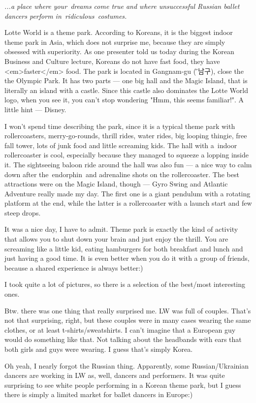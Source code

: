 \begin{post}
	\begin{content}
\textit{...a place where your dreams come true and where unsuccessful Russian ballet dancers perform in ridiculous costumes.}

Lotte World is a theme park. According to Koreans, it is the biggest indoor theme park in Asia, which does not surprise me, because they are simply obsessed with superiority. As one presenter told us today during the Korean Business and Culture lecture, Koreans do not have fast food, they have <em>faster</em> food. The park is located in Gangnam-gu ({\H 강남구}), close the the Olympic Park. It has two parts — one big hall and the Magic Island, that is literally an island with a castle. Since this castle also dominates the Lotte World logo, when you see it, you can't stop wondering "Hmm, this seems familiar!". A little hint — Disney.

I won't spend time describing the park, since it is a typical theme park with rollercoasters, merry-go-rounds, thrill rides, water rides, big looping thingie, free fall tower, lots of junk food and little screaming kids. The hall with a indoor rollercoaster is cool, especially because they managed to squeeze a lopping inside it. The sightseeing baloon ride around the hall was also fun — a nice way to calm down after the endorphin and adrenaline shots on the rollercoaster. The best attractions were on the Magic Island, though — Gyro Swing and Atlantic Adventure really made my day. The first one is a giant pendulum with a rotating platform at the end, while the latter is a rollercoaster with a launch start and few steep drops.

It was a nice day, I have to admit. Theme park is exactly the kind of activity that allows you to shut down your brain and just enjoy the thrill. You are screaming like a little kid, eating hamburgers for both breakfast and lunch and just having a good time. It is even better when you do it with a group of friends, because a shared experience is always better:)

I took quite a lot of pictures, so there is a selection of the best/most interesting ones.


Btw. there was one thing that really surprised me. LW was full of couples. That's not that surprising, right, but these couples were in many cases wearing the same clothes, or at least t-shirts/sweatshirts. I can't imagine that a European guy would do something like that. Not talking about the headbands with ears that both girls and guys were wearing. I guess that's simply Korea.

Oh yeah, I nearly forgot the Russian thing. Apparently, some Russian/Ukrainian dancers are working in LW as, well, dancers and performers. It was quite surprising to see white people performing in a Korean theme park, but I guess there is simply a limited market for ballet dancers in Europe:)
	\end{content}
\end{post}
